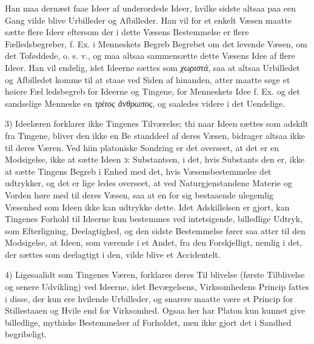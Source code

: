 \documentclass[12pt,a4paper]{book}
\newcommand{\gk}[1]{\textit{#1}}
\begin{document}
Han maa dernæst faae Ideer af underordede Ideer, hvilke
sidste altsaa paa een Gang vilde blive Urbilleder og Afbilleder.
Han vil for et enkelt Væsen maatte sætte flere Ideer eftersom
der i dette Væsens Bestemmelse er flere Fælledsbegreber, f. Ex.
i Menneskets Begreb Begrebet om det levende Væsen, om det
Toføddede, o. s. v., og maa altsaa sammensætte dette Væsens
Idee af flere Ideer. Han vil endelig, idet Ideerne sættes som
\gk{χωριστά}, saa at altsaa Urbilledet og Afbilledet komme til at
staae ved Siden af hinanden, atter maatte søge et høiere Fæl\-%
ledsbegreb for Ideerne og Tingene, for Menneskets Idee f. Ex.
og det sandselige Menneske en \gk{τρίτος ἄνθρωπος}, og saaledes
videre i det Uendelige.

3) Ideelæren forklarer ikke Tingenes Tilværelse; thi naar
Ideen sættes som adskilt fra Tingene, bliver den ikke en Be\-%
standdeel af deres Væsen, bidrager altsaa ikke til deres Væren.
Ved hiin platoniske Sondring er det overseet, at det er en
Modsigelse, ikke at sætte Ideen ɔ: Substantsen, i det, hvis
Substants den er, ikke at sætte Tingens Begreb i Enhed med
det, hvis Væsensbestemmelse det udtrykker, og det er lige\-%
ledes overseet, at ved Naturgjenstandene Materie og Vorden
høre med til deres Væsen, saa at en for sig bestaaende
ulegemlig Væsenhed som Ideen ikke kan udtrykke dette. Idet
Adskillelsen er gjort, kan Tingenes Forhold til Ideerne kun
bestemmes ved intetsigende, billedlige Udtryk, som Efterligning,
Deelagtighed, og den sidste Bestemmelse fører saa atter til
den Modsigelse, at Ideen, som værende i et Andet, fra den
Forskjelligt, nemlig i det, der sættes som deelagtigt i den,
vilde blive et Accidentelt.

4) Ligesaalidt som Tingenes Væren, forklares deres Til\-%
blivelse (første Tilblivelse og senere Udvikling) ved Ideerne,
idet Bevægelsens, Virksomhedens Princip fattes i disse, der
kun ere hvilende Urbilleder, og snarere maatte være et Princip
for Stillestaaen og Hvile end for Virksomhed. Ogsaa her har
Platon kun kunnet give billedlige, mythiske Bestemmelser af
Forholdet, men ikke gjort det i Sandhed begribeligt.
\end{document}
